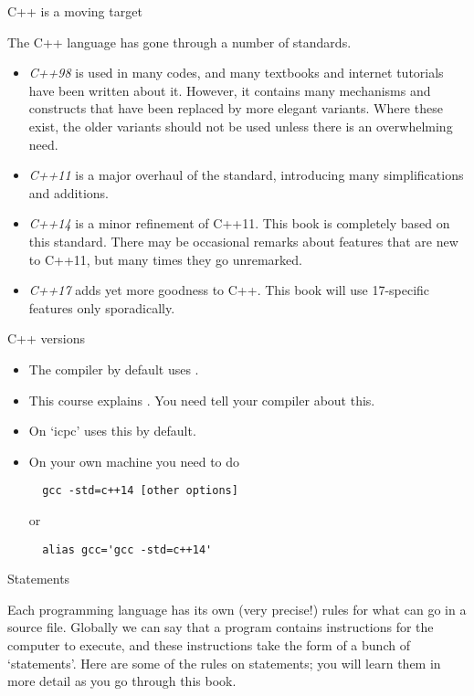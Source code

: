  {C++ is a moving target}

The C++ language has gone through a number of standards.
\begin{itemize}
\item \emph{C++98} is used in many codes, and many
  textbooks and internet tutorials have been written about
  it. However, it contains many mechanisms and constructs that have
  been replaced by more elegant variants. Where these exist, the older
  variants should not be used unless there is an overwhelming need.
\item \emph{C++11} is a major overhaul of the
  standard, introducing many simplifications and additions. 
\item \emph{C++14} is a minor refinement of C++11.
  This book is completely based on this standard. There may be
  occasional remarks about features that are new to C++11, but many
  times they go  unremarked.
\item \emph{C++17} adds yet more goodness to
  C++. This book will use 17-specific features only sporadically.
\end{itemize}

\begin{block}{C++ versions}
  \label{sl:cpp-version}
  \begin{itemize}
  \item
    The compiler by default uses . 
  \item This course explains . You need tell your compiler
    about this.
  \item On  `icpc' uses this by default.
  \item On your own machine you need to do
\begin{verbatim}
  gcc -std=c++14 [other options]
\end{verbatim}
or
\begin{verbatim}
  alias gcc='gcc -std=c++14'
\end{verbatim}
  \end{itemize}
\end{block}

 {Statements}
\label{sec:statements}

Each programming language has its own (very precise!) rules for what
can go in a source file. Globally we can say that a program contains
instructions for the computer to execute, and these instructions take
the form of a bunch of `statements'. Here are some of the rules on
statements; you will learn them in more detail as you go through this
book.

